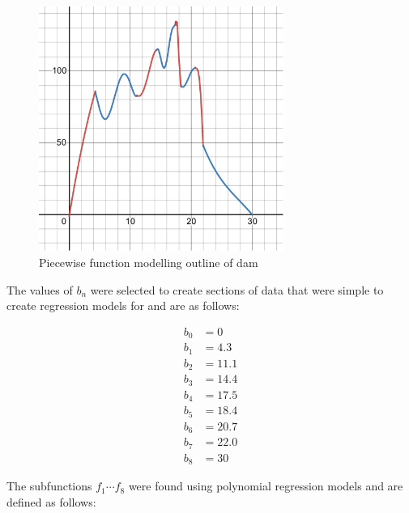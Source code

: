 \documentclass{article}
\theoremstyle{definition}
\begin{document}
    \begin{figure}
        \centering
        \includegraphics[width = 8cm]{damFunction.pdf}
        \caption{Piecewise function modelling outline of dam}
        \label{figDamFunction}
    \end{figure}

    The values of $b_n$ were selected to create sections of data that were simple to create regression models for and are as follows:

    \begin{align*}
        b_0 &= 0 \\
        b_1 &= 4.3 \\
        b_2 &= 11.1 \\
        b_3 &= 14.4 \\
        b_4 &= 17.5 \\
        b_5 &= 18.4 \\
        b_6 &= 20.7 \\
        b_7 &= 22.0 \\
        b_8 &= 30
    \end{align*}

    The subfunctions $f_1 \cdots f_8$ were found using polynomial regression models and are defined as follows:
\end{document}
